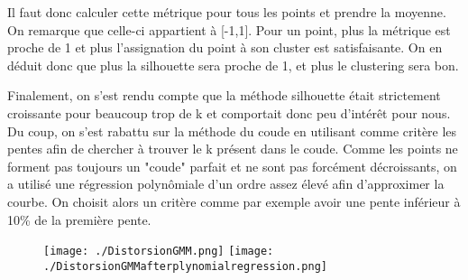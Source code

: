 \documentclass[a4paper,10pt]{article}
\begin{document}
Il faut donc calculer cette métrique pour tous les points et prendre la moyenne. On remarque que celle-ci appartient à [-1,1]. Pour un point, plus la métrique est proche de 1 et plus l'assignation du point à son cluster est satisfaisante. On en déduit donc que plus la silhouette sera proche de 1, et plus le clustering sera bon. 

Finalement, on s’est rendu compte que la méthode silhouette était strictement croissante pour beaucoup trop de k et comportait donc peu d’intérêt pour nous. Du coup, on s’est rabattu sur la méthode du coude en utilisant comme critère les pentes afin de chercher à trouver le k présent dans le coude. Comme les points ne forment pas toujours un "coude" parfait et ne sont pas forcément décroissants, on a utilisé une régression polynômiale d'un ordre assez élevé afin d'approximer la courbe. On choisit alors un critère comme par exemple avoir une pente inférieur à 10\% de la première pente.

\begin{figure}[h]
 \texttt{[image: ./DistorsionGMM.png]}
 \texttt{[image: ./DistorsionGMMafterplynomialregression.png]}
\end{figure}

\newpage
\end{document}
